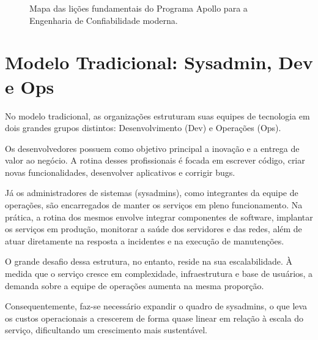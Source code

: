 \documentclass[12pt,a4paper,twoside]{report}
\begin{document}
\begin{figure}[h]
    \caption{Mapa das lições fundamentais do Programa Apollo para a Engenharia de Confiabilidade moderna.}
    \label{fig:licoes_apollo}
\end{figure}

\section{Modelo Tradicional: Sysadmin, Dev e Ops}

No modelo tradicional, as organizações estruturam suas equipes de tecnologia em dois grandes grupos distintos: Desenvolvimento (Dev) e Operações (Ops). 

Os desenvolvedores possuem como objetivo principal a inovação e a entrega de valor ao negócio. A rotina desses profissionais é focada em escrever código, criar novas funcionalidades, desenvolver aplicativos e corrigir bugs. 

Já os administradores de sistemas (sysadmins), como integrantes da equipe de operações, são encarregados de manter os serviços em pleno funcionamento. Na prática, a rotina dos mesmos envolve integrar componentes de software, implantar os serviços em produção, monitorar a saúde dos servidores e das redes, além de atuar diretamente na resposta a incidentes e na execução de manutenções.

O grande desafio dessa estrutura, no entanto, reside na sua escalabilidade. À medida que o serviço cresce em complexidade, infraestrutura e base de usuários, a demanda sobre a equipe de operações aumenta na mesma proporção. 

Consequentemente, faz-se necessário expandir o quadro de sysadmins, o que leva os custos operacionais a crescerem de forma quase linear em relação à escala do serviço, dificultando um crescimento mais sustentável.
\end{document}
